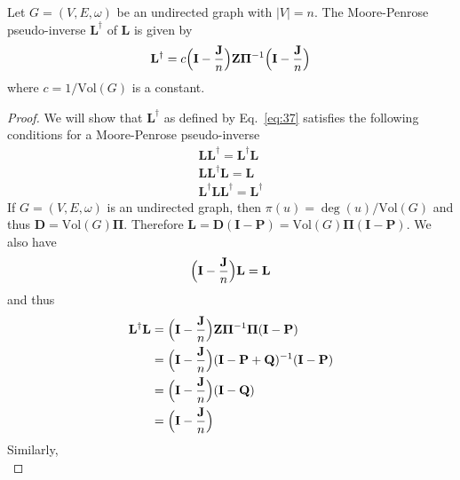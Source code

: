 \begin{proposition}
  \label{prop:11}
  Let $G = (V,E,\omega)$ be an undirected graph with $|V| = n$. The
  Moore-Penrose pseudo-inverse $\mathbf{L}^{\dagger}$ of $\mathbf{L}$ is given
  by
  \begin{equation}
    \label{eq:37}
    \mathbf{L}^{\dagger} = c \Bigl(\mathbf{I} - \frac{\mathbf{J}}{n}\Bigr) \mathbf{Z}
    \bm{\Pi}^{-1} \Bigl(\mathbf{I} - \frac{\mathbf{J}}{n}\Bigr)
  \end{equation}
  where $c = 1/\mathrm{Vol}(G)$ is a constant. 
\end{proposition}
\begin{proof}
  We will show that $\mathbf{L}^{\dagger}$ as defined by Eq.~\eqref{eq:37}
  satisfies the following conditions for a Moore-Penrose pseudo-inverse
  \begin{gather*}
    \mathbf{L}\mathbf{L}^{\dagger} = \mathbf{L}^{\dagger}\mathbf{L} \tag{(i)} \\
    \mathbf{L}\mathbf{L}^{\dagger}\mathbf{L} = \mathbf{L} \tag{(ii)} \\
    \mathbf{L}^{\dagger}\mathbf{L} \mathbf{L}^{\dagger} = \mathbf{L}^{\dagger}
    \tag{(iii)}
  \end{gather*}
  If $G = (V,E,\omega)$ is an undirected graph, then $\pi(u) =
  \deg(u)/\mathrm{Vol}(G)$ and thus $\mathbf{D} = \mathrm{Vol}(G)
  \bm{\Pi}$. Therefore $\mathbf{L} = \mathbf{D}(\mathbf{I} - \mathbf{P}) =
  \mathrm{Vol}(G) \bm{\Pi}(\mathbf{I} - \mathbf{P})$. We also have
  \begin{equation}
    \label{eq:38}
    \Bigl(\mathbf{I} - \frac{\mathbf{J}}{n}\Bigr)\mathbf{L} = \mathbf{L}
  \end{equation}
  and thus
  \begin{equation}
    \label{eq:39}
    \begin{split}
      \mathbf{L}^{\dagger}\mathbf{L} &= \Bigl(\mathbf{I} -
      \frac{\mathbf{J}}{n}\Bigr) \mathbf{Z}
      \bm{\Pi}^{-1} \bm{\Pi}(\mathbf{I} - \mathbf{P}) \\
      &= \Bigl(\mathbf{I} - \frac{\mathbf{J}}{n}\Bigr) (\mathbf{I} -
      \mathbf{P} + \mathbf{Q})^{-1}
      (\mathbf{I} - \mathbf{P}) \\
      &= \Bigl(\mathbf{I} - \frac{\mathbf{J}}{n}\Bigr)(\mathbf{I} - \mathbf{Q}) \\
      &= \Bigl(\mathbf{I} - \frac{\mathbf{J}}{n}\Bigr)
   \end{split}
  \end{equation}
  Similarly,
  \begin{equation}

\end{equation}
\end{proof}
